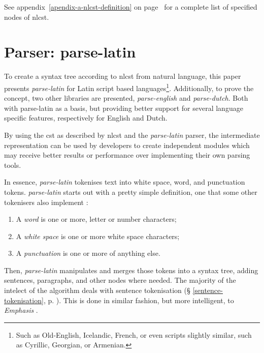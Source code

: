 \medskip \noindent See appendix~\ref{apendix-a-nlcst-definition} on
page~\pageref{apendix-a-nlcst-definition} for a complete list of
specified nodes of \gls{nlcst}.

\section{Parser: parse-latin}\label{parser-parse-latin}

To create a syntax tree according to \gls{nlcst} from natural language,
  this paper presents \emph{parse-latin} for Latin script based
  languages\footnote{Such
    as Old-English, Icelandic, French, or even scripts slightly similar, such
    as Cyrillic, Georgian, or Armenian.}.
Additionally, to prove the concept, two other libraries are presented,
  \emph{parse-english} and \emph{parse-dutch}. Both with parse-latin as a
  basis, but providing better support for several language specific features,
  respectively for English and Dutch.

By using the \gls{cst} as described by \gls{nlcst} and the \emph{parse-latin}
  parser, the intermediate representation can be used by developers to
  create independent modules which may receive better results or
  performance over implementing their own parsing tools.

In essence, \emph{parse-latin} tokenises text into white space, word, and
  punctuation tokens.
\emph{parse-latin} starts out with a pretty simple definition, one that
  some other tokenisers also implement \autocite{treebank-tokenisation}:

\begin{enumerate}
\item A \emph{word} is one or more, letter or number characters;
\item A \emph{white space} is one or more white space characters;
\item A \emph{punctuation} is one or more of anything else.
\end{enumerate}

Then, \emph{parse-latin} manipulates and merges those tokens into a
  syntax tree, adding sentences, paragraphs, and other nodes where needed.
The majority of the intelect of the algorithm deals with sentence
  tokenisation (§ \ref{sentence-tokenisation}, p.
  \pageref{sentence-tokenisation}).
This is done in similar fashion, but more intelligent, to \emph{Emphasis}
  \autocite{nytimes/emphasis-source-code}.

